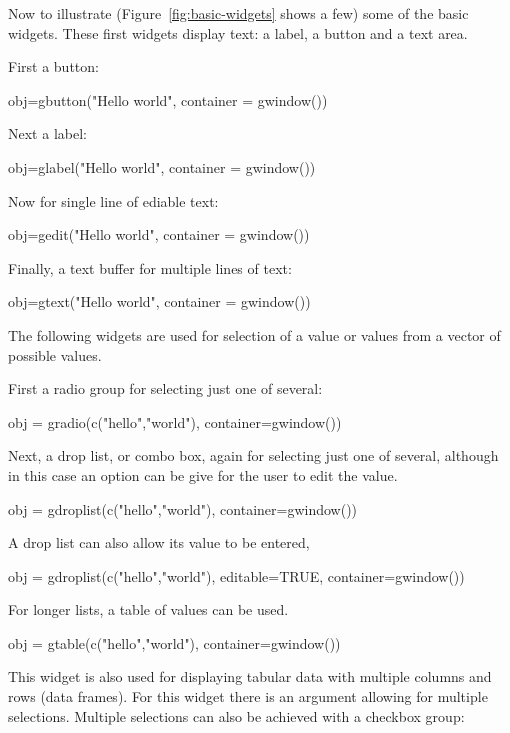 \documentclass[12pt]{article}
\begin{document}
Now to illustrate (Figure~\ref{fig:basic-widgets} shows a few) some of
the basic widgets.  These first widgets display text: a label, a
button and a text area.


First a button:
\begin{Scode}
  obj=gbutton("Hello world", container = gwindow())
\end{Scode}

Next a label:
\begin{Scode}
  obj=glabel("Hello world", container = gwindow())  
\end{Scode}

Now for single line of ediable text:
\begin{Scode}
  obj=gedit("Hello world", container = gwindow())
\end{Scode}

Finally, a text buffer for multiple lines of text:
\begin{Scode}
  obj=gtext("Hello world", container = gwindow())
\end{Scode}

The following widgets are used for selection of a value or values from
a vector of possible values.

First a radio group for selecting just one of several:
\begin{Scode}
  obj = gradio(c("hello","world"), container=gwindow())
\end{Scode}

Next, a drop list, or combo box, again for selecting just one of several,
although in this case an option can be give for the user to edit the value.
\begin{Scode}
  obj = gdroplist(c("hello","world"), container=gwindow())
\end{Scode}

A drop list can also allow its value to be entered,
\begin{Scode}
  obj = gdroplist(c("hello","world"), editable=TRUE, container=gwindow())
\end{Scode}


For longer lists, a table of values can be used.
\begin{Scode}
  obj = gtable(c("hello","world"), container=gwindow())
\end{Scode}
This widget is also used for displaying tabular data with multiple
columns and rows (data frames).  For this widget there is an argument
allowing for multiple selections. Multiple selections can also be achieved
with a checkbox group:
\end{document}
